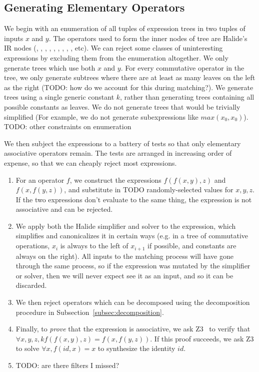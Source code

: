 \subsection{Generating Elementary Operators}
\label{subsec:generation}

We begin with an enumeration of all tuples of expression trees in two tuples of inputs $x$ and $y$. The operators used to form the inner nodes of tree are Halide's IR nodes (\code{*}, \code{+}, \code{-}, , , \code{\&\&}, \code{||}, , \code{<}, etc). We can reject some classes of uninteresting expressions by excluding them from the enumeration altogether. We only generate trees which use both $x$ and $y$. For every commutative operator in the tree, we only generate subtrees where there are at least as many leaves on the left as the right (TODO: how do we account for this during matching?). We generate trees using a single generic constant $k$, rather than generating trees containing all possible constants as leaves. We do not generate trees that would be trivially simplified (For example, we do not generate subexpressions like $max(x_0, x_0)$). TODO: other constraints on enumeration

We then subject the expressions to a battery of tests so that only elementary associative operators remain. The tests are arranged in increasing order of expense, so that we can cheaply reject most expressions.

\begin{enumerate}
\item For an operator $f$, we construct the expressions $f(f(x, y), z)$ and $f(x, f(y, z))$, and substitute in TODO randomly-selected values for $x, y, z$. If the two expressions don't evaluate to the same thing, the expression is not associative and can be rejected.
\item We apply both the Halide simplifier and solver to the expression, which simplifies and canonicalizes it in certain ways (e.g. in a tree of commutative operations, $x_i$ is always to the left of $x_{i+1}$ if possible, and constants are always on the right). All inputs to the matching process will have gone through the same process, so if the expression was mutated by the simplifier or solver, then we will never expect see it as an input, and so it can be discarded.
\item We then reject operators which can be decomposed using the decomposition procedure in Subsection~\ref{subsec:decomposition}.
\item Finally, to \emph{prove} that the expression is associative, we ask Z3~\cite{DeMoura:2008:ZES:1792734.1792766} to verify that $\forall x, y, z, k  f(f(x, y), z) = f(x, f(y, z))$. If this proof succeeds, we ask Z3 to solve $\forall x, f(id, x) = x$ to synthesize the identity $id$.
\item TODO: are there filters I missed?
\end{enumerate}

